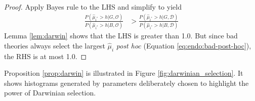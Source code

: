 \documentclass[12pt,english]{article}
\theoremstyle{plain}
\theoremstyle{plain}
\begin{document}
\begin{proof}
Apply Bayes rule to the LHS and simplify to yield
\begin{align*}
\frac{P\left(\hat{\mu}_{i^{\ast}}>h|G,\mathcal{O}\right)}{P\left(\hat{\mu}_{i^{\ast}}>h|B,\mathcal{O}\right)} & >\frac{P\left(\hat{\mu}_{i^{\ast}}>h|G,\mathcal{\mathcal{D}}\right)}{P\left(\hat{\mu}_{i^{\ast}}>h|B,\mathcal{\mathcal{D}}\right)}
\end{align*}
Lemma \ref{lem:darwin} shows that the LHS is greater than 1.0. But since bad theories always select the largest
$\hat{\mu}_{i}$ \emph{post hoc} (Equation \eqref{eq:endo:bad-post-hoc}), the RHS is at most 1.0. 
\end{proof}

Proposition \ref{prop:darwin} is illustrated in Figure \ref{fig:darwinian_selection}. It shows histograms generated by parameters deliberately chosen to highlight the power of Darwinian selection. 
\end{document}
